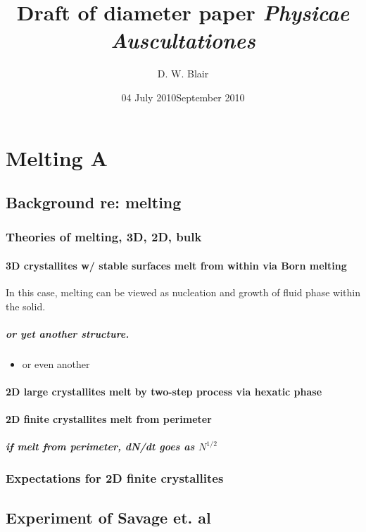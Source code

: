 \documentclass[pre,preprint]{revtex4-1}
\title{Draft of diameter paper}
\date{04 July 2010}
\begin{document}
\title{ \emph{Physicae Auscultationes}}
\author{D. W. Blair}
\date{September 2010}
\maketitle

\section{Melting A}
\label{sec-1}
\subsection{Background re: melting}
\label{sec-1.1}
\subsubsection{Theories of melting, 3D, 2D, bulk}
\label{sec-1.1.1}
\paragraph{3D crystallites w/ stable surfaces melt from within via Born melting}
\label{sec-1.1.1.1}

In this case, melting can be viewed as nucleation and growth of fluid phase within the solid.
\subparagraph{or yet another structure.}
\label{sec-1.1.1.1.1}
\begin{itemize}

\item or even another\\
\label{sec-1.1.1.1.1.1}%
\end{itemize} %
\paragraph{2D large crystallites melt by two-step process via hexatic phase}
\label{sec-1.1.1.2}
\paragraph{2D finite crystallites melt from perimeter}
\label{sec-1.1.1.3}
\subparagraph{if melt from perimeter, dN/dt goes as $N^{1/2}$}
\label{sec-1.1.1.3.1}
\subsubsection{Expectations for 2D finite crystallites}
\label{sec-1.1.2}
\subsection{Experiment of Savage et. al}
\label{sec-1.2}
\end{document}
